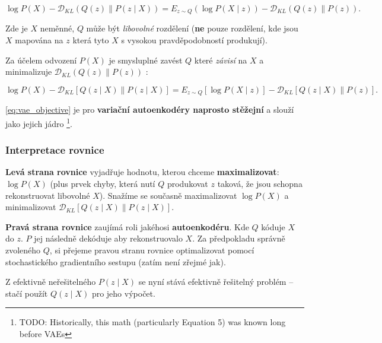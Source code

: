 \begin{equation}
    \log P(X) - \mathcal{D}_{KL}(Q(z)\parallel P(z\mid X)) = E_{z \sim Q}(\log P(X\mid z)) - \mathcal{D}_{KL}(Q(z)\parallel P(z)).
\end{equation}

Zde je $X$ neměnné, $Q$ může být \emph{libovolné} rozdělení (\textbf{ne} pouze rozdělení, kde jsou $X$ mapována na $z$ která tyto $X$ s vysokou pravděpodobností produkují).

Za účelem odvození $P(X)$ je smysluplné zavést $Q$ které \emph{závisí} na $X$ a minimalizuje $\mathcal{D}_{KL}(Q(z)\parallel P(z))$ \cite{Doersch2021}:

\begin{equation} \label{eq:vae_objective}
    \log P(X) - \mathcal{D}_{KL}\left[ Q(z \mid X)\parallel P(z\mid X) \right] = E_{z \sim Q}\left[ \log P(X\mid z)\right] - \mathcal{D}_{KL}\left[ Q(z\mid X)\parallel P(z) \right]. 
\end{equation}

\autoref{eq:vae_objective} je pro \textbf{variační autoenkodéry naprosto stěžejní} a slouží jako jejich jádro \footnote{TODO: Historically, this math (particularly Equation 5) was known long before VAEs}. \cite{Doersch2021}


\subsubsection{Interpretace rovnice}
\textbf{Levá strana rovnice} vyjadřuje hodnotu, kterou chceme \textbf{maximalizovat}: $\log P(X)$ (plus prvek chyby, která nutí $Q$ produkovat $z$ taková, že jsou schopna rekonstruovat libovolné $X$).
Snažíme se současně maximalizovat $\log P(X)$ a minimalizovat $\mathcal{D}_{KL}\left[ Q(z \mid X)\parallel P(z\mid X) \right]$. \cite{Doersch2021}

\textbf{Pravá strana rovnice} zaujímá roli jakéhosi \textbf{autoenkodéru}. Kde $Q$ kóduje $X$ do $z$. $P$ jej následně dekóduje aby rekonstruovalo $X$.
Za předpokladu správně zvoleného $Q$, si přejeme pravou stranu rovnice optimalizovat pomocí stochastického gradientního sestupu (zatím není zřejmé jak). \cite{Doersch2021}  

Z efektivně neřešitelného $P(z\mid X)$ se nyní stává efektivně řešitelný problém – stačí použít $Q(z\mid X)$ pro jeho výpočet. \cite{Doersch2021}